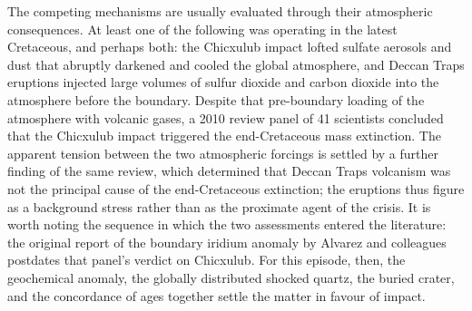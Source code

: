 \documentclass[11pt]{article}
\begin{document}
{The competing mechanisms are usually evaluated through their atmospheric consequences. At least one of the following was operating in the latest Cretaceous, and perhaps both: the Chicxulub impact lofted sulfate aerosols and dust that abruptly darkened and cooled the global atmosphere, and Deccan Traps eruptions injected large volumes of sulfur dioxide and carbon dioxide into the atmosphere before the boundary. Despite that pre-boundary loading of the atmosphere with volcanic gases, a 2010 review panel of 41 scientists concluded that the Chicxulub impact triggered the end-Cretaceous mass extinction. The apparent tension between the two atmospheric forcings is settled by a further finding of the same review, which determined that Deccan Traps volcanism was not the principal cause of the end-Cretaceous extinction; the eruptions thus figure as a background stress rather than as the proximate agent of the crisis. It is worth noting the sequence in which the two assessments entered the literature: the original report of the boundary iridium anomaly by Alvarez and colleagues postdates that panel's verdict on Chicxulub. For this episode, then, the geochemical anomaly, the globally distributed shocked quartz, the buried crater, and the concordance of ages together settle the matter in favour of impact.}
\end{document}
